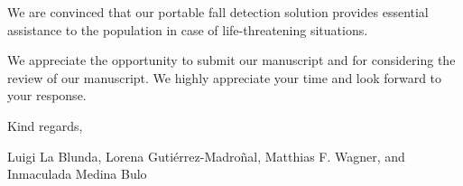 \documentclass[parskip]{scrartcl}
\begin{document}
We are convinced that our portable fall detection solution provides essential assistance to the population in case of life-threatening situations.


We appreciate the opportunity to submit our manuscript and for considering the review of our manuscript. We highly appreciate your time and look forward to your response.

Kind regards,

Luigi La Blunda, Lorena Gutiérrez-Madroñal,  Matthias F. Wagner, and Inmaculada Medina Bulo
\end{document}
